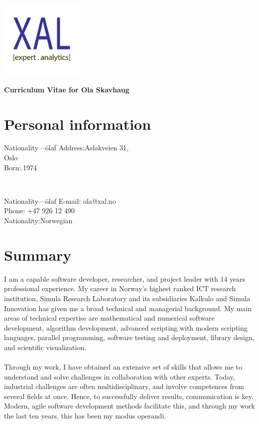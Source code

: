 \documentclass[english,a4paper,11pt]{article}
\begin{document}
\vspace*{-3cm}
\hspace*{12.5cm}\includegraphics[width=4cm]{logo.pdf}

\vspace*{-1.65cm}

\noindent
{\LARGE \bfseries \color{xaldark}Curriculum Vitae for Ola Skavhaug}

\section*{Personal information}

\begin{minipage}[t]{0.4\textwidth}
\begin{tabbing}Nationality---\=olaf\kill 
Address:\>Aslakveien 31, \\
 Oslo \\
Born:.1974 \\
\end{tabbing}
\end{minipage}
$\quad\quad$
\begin{minipage}[t]{0.3\textwidth}
\begin{tabbing}Nationality---\=olaf\kill 
E-mail: \>ola@xal.no\\
Phone: \>+47 926 12 490\\
Nationality:\>Norwegian\\
\end{tabbing}
\end{minipage}

\section*{Summary}
I am a capable software developer, researcher, and project leader with 14 years professional experience. My career in Norway’s highest ranked ICT research institution, Simula Research Laboratory and its subsidiaries Kalkulo and Simula Innovation has given me a broad technical and managerial background. My main areas of technical expertise are mathematical and numerical software development, algorithm development, advanced scripting with modern scripting languages, parallel programming, software testing and deployment, library design, and scientific visualization.\\
\\
Through my work, I have obtained an extensive set of skills that allows me to understand and solve challenges in collaboration with other experts. Today, industrial challenges are often multidisciplinary, and involve competences from several fields at once. Hence, to successfully deliver results, communication is key. Modern, agile software development methods facilitate this, and through my work the last ten years, this has been my modus operandi.
\end{document}
